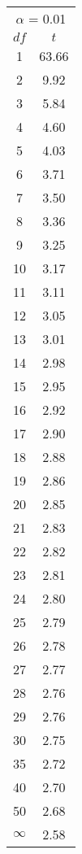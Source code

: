 \begin{tabular}{|c|c|}\hline
 \multicolumn{2}{|c|}{$\alpha$ = 0.01}\\
$df$ & $t$ \\ \hline
1 & 63.66\\
2 & 9.92\\
3 & 5.84\\
4 & 4.60\\
5 & 4.03\\
6 & 3.71\\
7 & 3.50\\
8 & 3.36\\
9 & 3.25\\
10 & 3.17\\
11 & 3.11\\
12 & 3.05\\
13 & 3.01\\
14 & 2.98\\
15 & 2.95\\
16 & 2.92\\
17 & 2.90\\
18 & 2.88\\
19 & 2.86\\
20 & 2.85\\
21 & 2.83\\
22 & 2.82\\
23 & 2.81\\
24 & 2.80\\
25 & 2.79\\
26 & 2.78\\
27 & 2.77\\
28 & 2.76\\
29 & 2.76\\
30 & 2.75\\
35 & 2.72\\
40 & 2.70\\
50 & 2.68\\
$\infty$ & 2.58\\
\hline \end{tabular}

